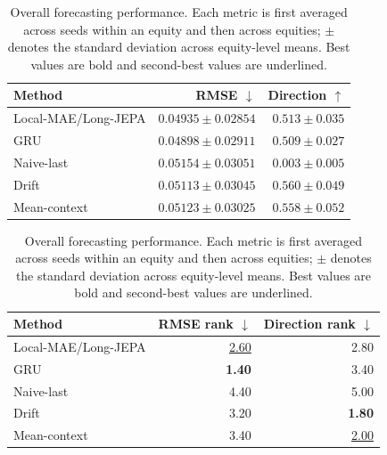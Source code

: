 \begin{table}[t]
\centering
\small
\caption{Overall forecasting performance. Each metric is first averaged across seeds within an equity and then across equities; $\pm$ denotes the standard deviation across equity-level means. Best values are bold and second-best values are underlined.}
\label{tab:main_metrics}
\begin{tabular}{lrr}
\toprule
Method & RMSE $\downarrow$ & Direction $\uparrow$ \\
\midrule
Local-MAE/Long-JEPA & \underline{$0.04935 \pm 0.02854$} & $0.513 \pm 0.035$ \\
GRU & \textbf{$0.04898 \pm 0.02911$} & $0.509 \pm 0.027$ \\
Naive-last & $0.05154 \pm 0.03051$ & $0.003 \pm 0.005$ \\
Drift & $0.05113 \pm 0.03045$ & \textbf{$0.560 \pm 0.049$} \\
Mean-context & $0.05123 \pm 0.03025$ & \underline{$0.558 \pm 0.052$} \\
\bottomrule
\end{tabular}
\par\medskip
\begin{tabular}{lrr}
\toprule
Method & RMSE rank $\downarrow$ & Direction rank $\downarrow$ \\
\midrule
Local-MAE/Long-JEPA & \underline{2.60} & 2.80 \\
GRU & \textbf{1.40} & 3.40 \\
Naive-last & 4.40 & 5.00 \\
Drift & 3.20 & \textbf{1.80} \\
Mean-context & 3.40 & \underline{2.00} \\
\bottomrule
\end{tabular}
\end{table}

